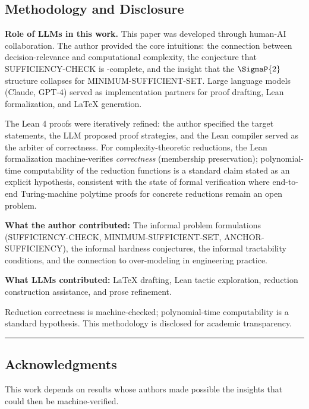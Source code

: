 \subsection*{Methodology and Disclosure}

\textbf{Role of LLMs in this work.} This paper was developed through human-AI collaboration. The author provided the core intuitions: the connection between decision-relevance and computational complexity, the conjecture that SUFFICIENCY-CHECK is \coNP-complete, and the insight that the $\SigmaP{2}$ structure collapses for MINIMUM-SUFFICIENT-SET. Large language models (Claude, GPT-4) served as implementation partners for proof drafting, Lean formalization, and \LaTeX{} generation.

The Lean 4 proofs were iteratively refined: the author specified the target statements, the LLM proposed proof strategies, and the Lean compiler served as the arbiter of correctness. For complexity-theoretic reductions, the Lean formalization machine-verifies \emph{correctness} (membership preservation); polynomial-time computability of the reduction functions is a standard claim stated as an explicit hypothesis, consistent with the state of formal verification where end-to-end Turing-machine polytime proofs for concrete reductions remain an open problem.

\textbf{What the author contributed:} The informal problem formulations (SUFFICIENCY-CHECK, MINIMUM-SUFFICIENT-SET, ANCHOR-SUFFICIENCY), the informal hardness conjectures, the informal tractability conditions, and the connection to over-modeling in engineering practice.

\textbf{What LLMs contributed:} \LaTeX{} drafting, Lean tactic exploration, reduction construction assistance, and prose refinement.

Reduction correctness is machine-checked; polynomial-time computability is a standard hypothesis. This methodology is disclosed for academic transparency.

\begin{center}\rule{0.5\linewidth}{0.5pt}\end{center}

\subsection*{Acknowledgments}

This work depends on results whose authors made possible the insights that could then be machine-verified.

